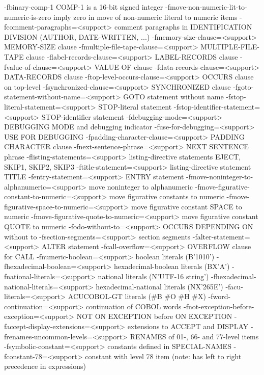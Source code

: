   -fbinary-comp-1        COMP-1 is a 16-bit signed integer
  -fmove-non-numeric-lit-to-numeric-is-zero	imply zero in move of non-numeric literal to numeric items
  -fcomment-paragraphs=<support>	comment paragraphs in IDENTIFICATION DIVISION (AUTHOR, DATE-WRITTEN, ...)
  -fmemory-size-clause=<support>	MEMORY-SIZE clause
  -fmultiple-file-tape-clause=<support>	MULTIPLE-FILE-TAPE clause
  -flabel-records-clause=<support>	LABEL-RECORDS clause
  -fvalue-of-clause=<support>	VALUE-OF clause
  -fdata-records-clause=<support>	DATA-RECORDS clause
  -ftop-level-occurs-clause=<support>	OCCURS clause on top-level
  -fsynchronized-clause=<support>	SYNCHRONIZED clause
  -fgoto-statement-without-name=<support>	GOTO statement without name
  -fstop-literal-statement=<support>	STOP-literal statement
  -fstop-identifier-statement=<support>	STOP-identifier statement
  -fdebugging-mode=<support>	DEBUGGING MODE and debugging indicator
  -fuse-for-debugging=<support>	USE FOR DEBUGGING
  -fpadding-character-clause=<support>	PADDING CHARACTER clause
  -fnext-sentence-phrase=<support>	NEXT SENTENCE phrase
  -flisting-statements=<support>	listing-directive statements EJECT, SKIP1, SKIP2, SKIP3
  -ftitle-statement=<support>	listing-directive statement TITLE
  -fentry-statement=<support>	ENTRY statement
  -fmove-noninteger-to-alphanumeric=<support>	move noninteger to alphanumeric
  -fmove-figurative-constant-to-numeric=<support>	move figurative constants to numeric
  -fmove-figurative-space-to-numeric=<support>	move figurative constant SPACE to numeric
  -fmove-figurative-quote-to-numeric=<support>	move figurative constant QUOTE to numeric
  -fodo-without-to=<support>	OCCURS DEPENDING ON without to
  -fsection-segments=<support>	section segments
  -falter-statement=<support>	ALTER statement
  -fcall-overflow=<support>	OVERFLOW clause for CALL
  -fnumeric-boolean=<support>	boolean literals (B'1010')
  -fhexadecimal-boolean=<support>	hexadecimal-boolean literals (BX'A')
  -fnational-literals=<support>	national literals (N'UTF-16 string')
  -fhexadecimal-national-literals=<support>	hexadecimal-national literals (NX'265E')
  -facu-literals=<support>	ACUCOBOL-GT literals (#B #O #H #X)
  -fword-continuation=<support>	continuation of COBOL words
  -fnot-exception-before-exception=<support>	NOT ON EXCEPTION before ON EXCEPTION
  -faccept-display-extensions=<support>	extensions to ACCEPT and DISPLAY
  -frenames-uncommon-levels=<support>	RENAMES of 01-, 66- and 77-level items
  -fsymbolic-constant=<support>	constants defined in SPECIAL-NAMES
  -fconstant-78=<support>	constant with level 78 item (note: has left to right precedence in expressions)
